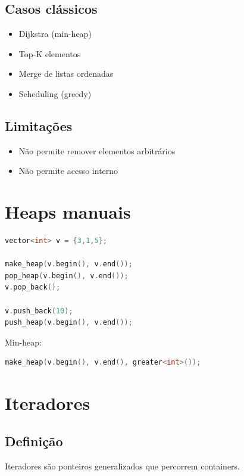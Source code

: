 \documentclass[11pt]{article}
\begin{document}
\subsection{Casos clássicos}

\begin{itemize}
    \item Dijkstra (min-heap)
    \item Top-K elementos
    \item Merge de listas ordenadas
    \item Scheduling (greedy)
\end{itemize}

\subsection{Limitações}

\begin{itemize}
    \item Não permite remover elementos arbitrários
    \item Não permite acesso interno
\end{itemize}

\section{Heaps manuais}

\begin{lstlisting}[language=C++]
vector<int> v = {3,1,5};

make_heap(v.begin(), v.end());
pop_heap(v.begin(), v.end());
v.pop_back();

v.push_back(10);
push_heap(v.begin(), v.end());
\end{lstlisting}

Min-heap:
\begin{lstlisting}[language=C++]
make_heap(v.begin(), v.end(), greater<int>());
\end{lstlisting}

\section{Iteradores}

\subsection{Definição}

Iteradores são ponteiros generalizados que percorrem containers.
\end{document}
